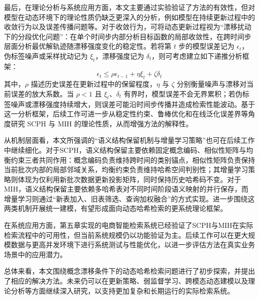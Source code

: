 最后，在理论分析与系统应用方面，本文主要通过实验验证了方法的有效性，但对模型在动态环境下的理论性质仍缺乏更深入的分析，例如模型在持续更新过程中的收敛行为以及误差传播问题等。对于收敛行为，可将动态更新过程视为“漂移扰动下的分段优化问题”：在单个时间步内部分析目标函数的局部收敛性，在跨时间步层面分析最优解轨迹随漂移强度变化的稳定性。若将第 $t$ 步的模型误差记为 $\epsilon_t$，伪标签噪声或采样扰动记为 $\xi_t$，漂移强度记为 $\delta_t$，则可考虑建立如下递推分析框架：
\begin{equation}
  \epsilon_t \leq \rho \epsilon_{t-1} + \eta \xi_t + \zeta \delta_t
\end{equation}
其中，$\rho$ 描述历史误差在更新过程中的保留程度，$\eta$ 与 $\zeta$ 分别衡量噪声与漂移对当前误差的放大系数。当 $\rho < 1$ 且 $\xi_t$、$\delta_t$ 有界时，模型误差不会无界累积；若伪标签噪声或漂移强度持续增大，则误差可能沿时间步传播并造成检索性能波动。基于这一分析框架，后续工作可进一步从稳定性约束、鲁棒优化和在线泛化误差界等角度研究 SCPH 与 MIH 的理论性质，从而增强方法的解释性。

从机制层面看，本文所强调的“语义结构保留机制与增量学习策略”也可在后续工作中继续细化。对于SCPH，语义结构保留主要依赖固定概念编码、相似性矩阵与均衡约束三者共同作用：概念编码负责维持跨时间的类别锚点，相似性矩阵负责保持当前批次内部的局部邻域关系，均衡约束负责维持哈希空间判别性；其增量学习策略则体现为仅利用新批次数据更新投影矩阵，同时保持历史哈希码不变。对于MIH，语义结构保留主要依赖多哈希表对不同时间阶段语义映射的并行保存，而增量学习则通过“新表加入、旧表筛选、查询加权融合”的方式实现。进一步围绕这两类机制开展统一建模，有望形成面向动态哈希检索的更系统理论框架。

在系统应用方面，第五章实现的电商智能检索系统已经验证了SCPH与MIH在实际检索流程中的可用性，但当前系统规模仍以功能验证为主。后续工作可以在更大规模数据与更高并发环境下进行系统测试与性能优化，以进一步评估方法在真实业务场景中的应用潜力。

总体来看，本文围绕概念漂移条件下的动态哈希检索问题进行了初步探索，并提出了相应的解决方法。未来仍可以在更新策略、弱监督学习、跨模态动态建模以及理论分析等方面继续深入研究，以支持更加复杂和长期运行的实际检索系统。
